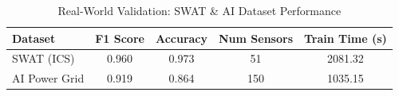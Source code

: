 \begin{table}[h]
\centering
\caption{Real-World Validation: SWAT \& AI Dataset Performance}
\label{tab:realworld_empirical}
\begin{tabular}{lcccc}
\toprule
\textbf{Dataset} & \textbf{F1 Score} & \textbf{Accuracy} & \textbf{Num Sensors} & \textbf{Train Time (s)} \\
\midrule
SWAT (ICS) & 0.960 & 0.973 & 51 & 2081.32 \\
AI Power Grid & 0.919 & 0.864 & 150 & 1035.15 \\
\bottomrule
\end{tabular}
\end{table}